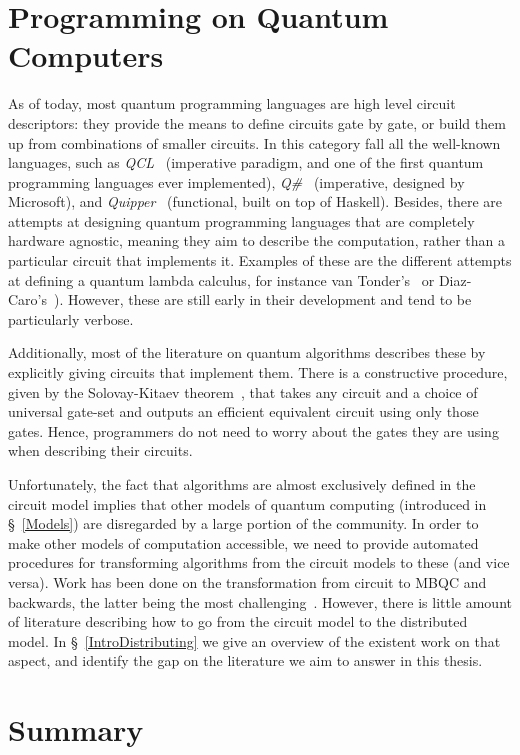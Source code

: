 \section{Programming on Quantum Computers}

As of today, most quantum programming languages are high level circuit descriptors: they provide the means to define circuits gate by gate, or build them up from combinations of smaller circuits. In this category fall all the well-known languages, such as \textit{QCL}~\citep{QCL} (imperative paradigm, and one of the first quantum programming languages ever implemented), \textit{Q\#}~\citep{QLang} (imperative, designed by Microsoft), and \textit{Quipper}~\citep{Quipper} (functional, built on top of Haskell). Besides, there are attempts at designing quantum programming languages that are completely hardware agnostic, meaning they aim to describe the computation, rather than a particular circuit that implements it. Examples of these are the different attempts at defining a quantum lambda calculus, for instance van Tonder's~\citep{vanTonder} or Diaz-Caro's~\citep{Diaz-Caro}). However, these are still early in their development and tend to be particularly verbose.

Additionally, most of the literature on quantum algorithms describes these by explicitly giving circuits that implement them. There is a constructive procedure, given by the Solovay-Kitaev theorem~\citep{SolovayKitaev}, that takes any circuit and a choice of universal gate-set and outputs an efficient equivalent circuit using only those gates. Hence, programmers do not need to worry about the gates they are using when describing their circuits.

Unfortunately, the fact that algorithms are almost exclusively defined in the circuit model implies that other models of quantum computing (introduced in \S~\ref{Models}) are disregarded by a large portion of the community. In order to make other models of computation accessible, we need to provide automated procedures for transforming algorithms from the circuit models to these (and vice versa). Work has been done on the transformation from circuit to MBQC and backwards, the latter being the most challenging~\citep{gflow}. However, there is little amount of literature describing how to go from the circuit model to the distributed model. In \S~\ref{IntroDistributing} we give an overview of the existent work on that aspect, and identify the gap on the literature we aim to answer in this thesis.


\section{Summary}

